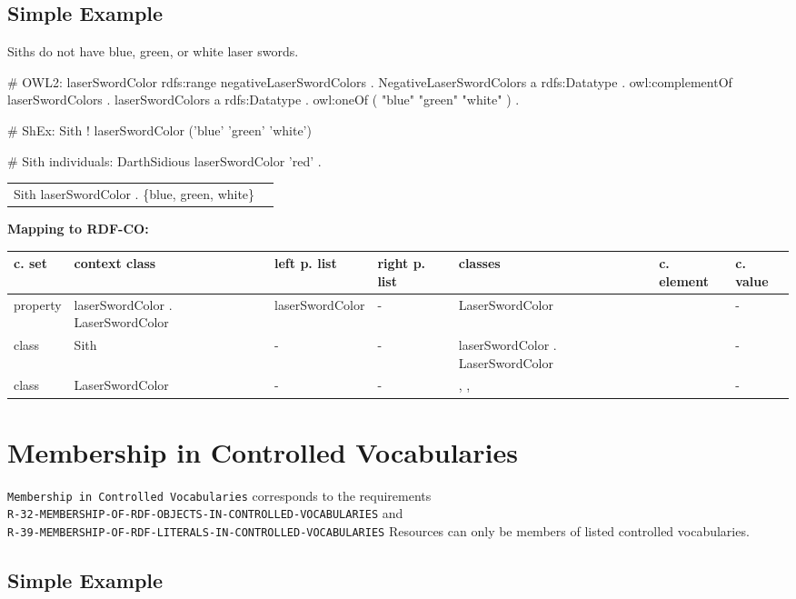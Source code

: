 \documentclass{llncs}
\newcommand{\ms}[1]{\texttt{#1}}
\newenvironment{gcotable}{
  \scriptsize
  \sffamily
  \vspace{0cm}
	\begin{center}
	\textbf{\vspace{0.4cm}Mapping to RDF-CO:} \\
  \begin{tabular}{l|l|l|l|l|l|l}
	\hline
  \textbf{c. set} & \textbf{context class} & \textbf{left p. list} & \textbf{right p. list} & \textbf{classes} & \textbf{c. element} & \textbf{c. value} \\
  \hline

}{
  \hline
  \end{tabular}
	\end{center}
}
\newenvironment{DL}{
\vspace{0cm}
	\begin{center}
  \begin{tabular}{r l}

}{
  \end{tabular}
	\end{center}
}
\begin{document}
\subsection{Simple Example}

Siths do not have blue, green, or white laser swords.

\begin{ex}
# OWL2:
laserSwordColor rdfs:range negativeLaserSwordColors . 
NegativeLaserSwordColors
    a rdfs:Datatype .
    owl:complementOf laserSwordColors .
laserSwordColors
    a rdfs:Datatype .
    owl:oneOf ( "blue" "green" "white" ) .
\end{ex}

\begin{ex}
# ShEx:
Sith {
    ! laserSwordColor ('blue' 'green' 'white') }
\end{ex}

\begin{ex}
# Sith individuals:
DarthSidious
    laserSwordColor 'red' .
\end{ex}

\begin{DL}
Sith    laserSwordColor . \{blue, green, white\} \\
\end{DL}

\begin{gcotable}
property &  laserSwordColor . LaserSwordColor & laserSwordColor & - & LaserSwordColor &  & - \\
class & Sith & - & - &  laserSwordColor . LaserSwordColor &  & - \\
class & LaserSwordColor & - & - & , ,  &  & - \\
\end{gcotable}

\section{Membership in Controlled Vocabularies}

\ms{Membership in Controlled Vocabularies} corresponds to the requirements \\
\ms{R-32-MEMBERSHIP-OF-RDF-OBJECTS-IN-CONTROLLED-VOCABULARIES} and \\
\ms{R-39-MEMBERSHIP-OF-RDF-LITERALS-IN-CONTROLLED-VOCABULARIES}
Resources can only be members of listed controlled vocabularies.

\subsection{Simple Example}
\end{document}
